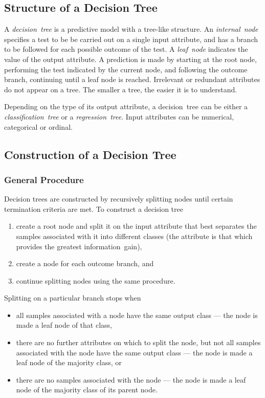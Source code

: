 \subsection{Structure of a Decision Tree}

A \emph{decision~tree} is a predictive model with a tree-like structure.
An \emph{internal~node} specifies a test to be be carried out on a single input attribute, and has a branch to be followed for each possible outcome of the test.
A \emph{leaf~node} indicates the value of the output attribute.
A prediction is made by starting at the root node, performing the test indicated by the current node, and following the outcome branch, continuing until a leaf node is reached.
Irrelevant or redundant attributes do not appear on a tree.
The smaller a tree, the easier it is to understand.

Depending on the type of its output attribute, a decision~tree can be either a \emph{classification~tree} or a \emph{regression~tree}.
Input attributes can be numerical, categorical or ordinal.

\subsection{Construction of a Decision Tree}

\subsubsection{General Procedure}

Decision trees are constructed by recursively splitting nodes until certain termination criteria are met.
To construct a decision tree
\begin{enumerate}
  \item create a root node and split it on the input attribute that best separates the samples associated with it into different classes (the attribute is that which provides the greatest information~gain),
  \item create a node for each outcome branch, and
  \item continue splitting nodes using the same procedure.
\end{enumerate}
Splitting on a particular branch stops when
\begin{itemize}
  \item all samples associated with a node have the same output class --- the node is made a leaf node of that class,
  \item there are no further attributes on which to split the node, but not all samples associated with the node have the same output class --- the node is made a leaf node of the majority class, or
  \item there are no samples associated with the node --- the node is made a leaf node of the majority class of its parent node.
\end{itemize}


